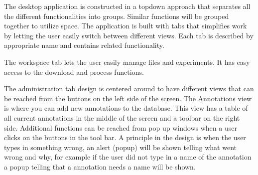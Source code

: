 The desktop application is constructed in a topdown approach that separates all the different functionalities into groups. Similar functions will be grouped together to utilize space.
The application is built with tabs that simplifies work by letting the user easily switch between different views. Each tab is described by appropriate name and contains related functionality.

The workspace tab lets the user easily manage files and experiments. It has easy access to the download and process functions.

The administration tab design is centered around to have different views that can be reached from the buttons on the left side of the screen. The Annotations view is where you can add new annotations to the database. This view has a table of all current annotations in the middle of the screen and a toolbar on the right side. Additional functions can be reached from pop up windows when a user clicks on the buttons in the tool bar.
A principle in the design is when the user types in something wrong, an alert (popup) will be shown telling what went wrong and why, for example if the user did not type in a name of the annotation a popup telling that a annotation needs a name will be shown.  
\FloatBarrier

